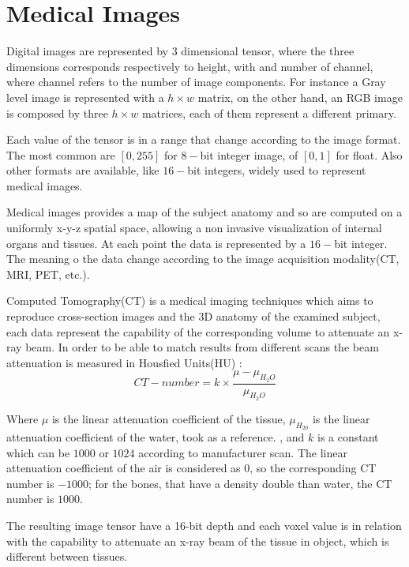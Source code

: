 \documentclass{standalone}
\begin{document}
	\section{Medical Images}
	
	Digital images are represented by 3 dimensional tensor, where the three dimensions corresponds respectively to height, with and number of channel, where channel refers to the number of image components. For instance a Gray level image is represented with a $h\times w$ matrix, on the other hand, an RGB image is composed by three $h\times w$ matrices, each of them represent a different primary. 
	
	Each value of the tensor is in a range that change according to the image format. The most common are $[0, 255]$ for $8-$bit integer image, of $[0, 1]$ for float. Also other formats are available, like $16-$bit integers, widely used to represent medical images.

	Medical images provides a map of the subject anatomy and so are computed on a uniformly x-y-z spatial space, allowing a non invasive visualization of internal organs and tissues. At each point the data is represented by a $16-$bit integer. The meaning o the data change according to the image acquisition modality(CT, MRI, PET, etc.).
	
	Computed Tomography(CT) is a medical imaging techniques which aims to reproduce  cross-section images and the 3D anatomy of the examined subject, each data represent the capability  of the corresponding volume to attenuate an x-ray beam. In order to be able to match results from different scans the beam attenuation is measured in Housfied Units(HU) : 
	\begin{equation}\label{eq:HU}
		CT-number = k\times\frac{\mu - \mu_{H_2O}}{\mu_{H_2O}}
	\end{equation}
	
	Where $\mu$ is the linear attenuation coefficient of the tissue, $\mu_{H_20}$ is the linear attenuation coefficient of the water, took as a reference. , and $k$ is a constant which can be $1000$ or $1024$ according to manufacturer scan. The linear attenuation coefficient of the air is considered as $0$, so the corresponding CT number is $-1000$; for the bones, that have a density double than water, the CT number is $1000$. 
	
	The resulting image tensor have a 16-bit depth and each voxel value is in relation with the capability to attenuate an x-ray beam of the tissue in object, which is different between tissues.
		
\end{document}
